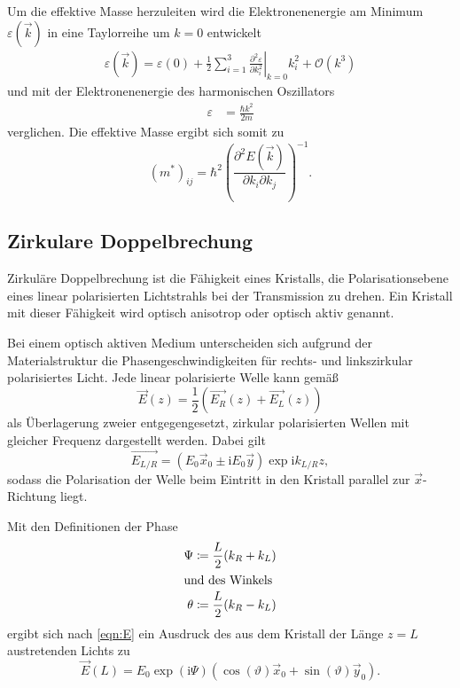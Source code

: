 Um die effektive Masse herzuleiten wird die Elektronenenergie am Minimum $\varepsilon(\vec{k})$ in eine Taylorreihe um $k=0$ entwickelt
\begin{align*}
    \varepsilon(\vec{k})=\varepsilon(0) + \frac{1}{2}\sum_{i=1}^3 \left. \frac{\partial^2 \varepsilon}{\partial k_i^2}\right|_{k=0}k_i^2 + \mathcal{O}(k^3)
\end{align*}
und mit der Elektronenenergie des harmonischen Oszillators
\begin{align*}
    \varepsilon &= \frac{\hbar k^2}{2m}
\end{align*}
verglichen.
Die effektive Masse ergibt sich somit zu
\begin{equation*}
    (m^*)_{ij} = \hbar^2 \left( \frac{\partial^2 E(\vec{k})}{\partial k_i \partial k_j} \right)^{-1}. 
\end{equation*}


\subsection{Zirkulare Doppelbrechung}
\label{sub:Doppelbrechung}
Zirkuläre Doppelbrechung ist die Fähigkeit eines Kristalls, die Polarisationsebene eines linear polarisierten Lichtstrahls bei der Transmission
zu drehen. Ein Kristall mit dieser Fähigkeit wird optisch anisotrop oder optisch aktiv genannt.

Bei einem optisch aktiven Medium unterscheiden sich aufgrund der Materialstruktur die Phasengeschwindigkeiten für rechts- und linkszirkular
polarisiertes Licht.
Jede linear polarisierte Welle kann gemäß
\begin{equation}
    \vec{E}(z)=\frac{1}{2}(\vec{E_R}(z)+\vec{E_L}(z))
    \label{eqn:E}   
\end{equation}
als Überlagerung zweier entgegengesetzt, zirkular polarisierten Wellen mit gleicher Frequenz dargestellt werden. Dabei gilt
\begin{equation*}
    \vec{E_{L/R}}=(E_0\vec{x}_0\pm \text{i}E_0\vec{y})\exp{\text{i}k_{L/R}z},
\end{equation*}
sodass die Polarisation der Welle beim Eintritt in den Kristall parallel zur $\vec{x}$-Richtung liegt.

Mit den Definitionen der Phase
\begin{align*}
    \Psi  &\coloneqq \frac{L}{2}(k_R+k_L)\\
    \shortintertext{und des Winkels}
    \theta&\coloneqq \frac{L}{2}(k_R-k_L)
\end{align*}
ergibt sich nach \autoref{eqn:E} ein Ausdruck des aus dem Kristall der Länge $z=L$ austretenden Lichts zu 
\begin{equation*}
    \vec{E}(L)=E_0 \exp(\text{i}\Psi)\left(\cos(\vartheta) \vec{x}_0 + \sin(\vartheta)\vec{y}_0\right).
\end{equation*}


